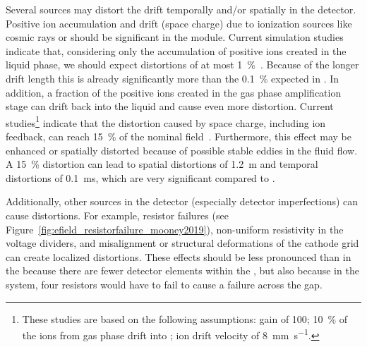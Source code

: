 Several sources may distort the drift \efield temporally and/or spatially in the detector. Positive ion accumulation and drift (space charge) due to ionization sources like cosmic rays or  should be significant in the    module. Current simulation studies indicate that, considering only the accumulation of positive ions created in the liquid phase, we should expect \efield distortions of at most \SI{1}{\%}~\cite{bib:mooney2018}. Because of the longer drift length this is already significantly more than the \SI{0.1}{\%} expected in . In addition, a fraction of the positive ions created in the gas phase amplification stage can drift back into the liquid and cause even more distortion. Current studies\footnote{These studies are based on the following assumptions:  gain of \num{100}; \SI{10}{\%} of the ions from gas phase drift into \lar; ion drift velocity of \SI{8}{\milli\metre\per\s}.} indicate that the \efield distortion caused by space charge, including ion feedback, can reach \SI{15}{\%} of the nominal field~\cite{bib:yu2018a}.
Furthermore, this effect may be enhanced or spatially distorted because of possible stable eddies in the  fluid flow. A \SI{15}{\%} distortion can lead to spatial distortions of \SI{1.2}{\metre} and temporal distortions of \SI{0.1}{\milli\s}, which are very significant compared to . 

Additionally, other sources in the detector (especially detector imperfections) can cause \efield distortions. For example,  resistor failures (see Figure~\ref{fig:efield_resistorfailure_mooney2019}), non-uniform resistivity in the voltage dividers, and misalignment or structural deformations of the cathode grid can create localized \efield distortions. These effects should be less pronounced than in the  because there are fewer detector elements within the , but also because in the  system, four resistors would have to fail to cause a failure across the  gap.


